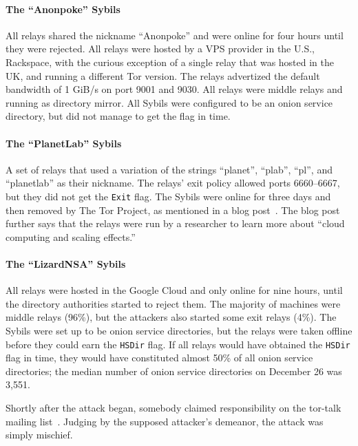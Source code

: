 \paragraph{The ``Anonpoke'' Sybils}
All relays shared the nickname ``Anonpoke'' and were online for four hours until
they were rejected.  All relays were hosted by a VPS provider in the U.S.,
Rackspace, with the curious exception of a single relay that was hosted in the
UK, and running a different Tor version.  The relays advertized the default
bandwidth of 1 GiB/s on port 9001 and 9030.  All relays were middle relays and
running as directory mirror.  All Sybils were configured to be an onion service
directory, but did not manage to get the flag in time.

\paragraph{The ``PlanetLab'' Sybils}
A set of relays that used a variation of the strings ``planet'', ``plab'',
``pl'', and ``planetlab'' as their nickname.  The relays' exit policy allowed
ports 6660--6667, but they did not get the \texttt{Exit} flag.  The Sybils were
online for three days and then removed by The Tor Project, as mentioned in a
blog post~\cite{progressreport}.  The blog post further says that the relays
were run by a researcher to learn more about ``cloud computing and scaling
effects.''

\paragraph{The ``LizardNSA'' Sybils}
All relays were hosted in the Google Cloud and only online for nine hours, until
the directory authorities started to reject them.  The majority of machines were
middle relays (96\%), but the attackers also started some exit relays (4\%).
The Sybils were set up to be onion service directories, but the relays were
taken offline before they could earn the \texttt{HSDir} flag.  If all relays
would have obtained the \texttt{HSDir} flag in time, they would have constituted
almost 50\% of all onion service directories; the median number of onion service
directories on December 26 was 3,551.

Shortly after the attack began, somebody claimed responsibility on the tor-talk
mailing list~\cite{lizards}.  Judging by the supposed attacker's demeanor, the
attack was simply mischief.

